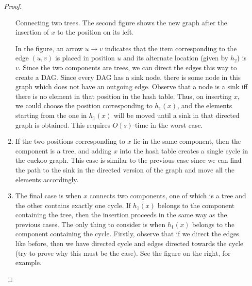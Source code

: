 \begin{proof}
\begin{enumerate}
\begin{marginfigure}
      
      \caption{Connecting two trees. The second figure shows the new graph after
        the insertion of $x$ to the position on its left.}
      \label{fig:cuckoo-insert-1}
    \end{marginfigure}

    In the figure, an arrow $u \to v$ indicates that the item corresponding to
    the edge $(u,v)$ is placed in position $u$ and its alternate location (given
    by $h_2$) is $v$. Since the two components are trees, we can direct the
    edges this way to create a DAG. Since every DAG has a sink node, there is
    some node in this graph which does not have an outgoing edge. Observe that a
    node is a sink iff there is no element in that position in the hash
    table. Thus, on inserting $x$, we could choose the position corresponding to
    $h_1(x)$, and the elements starting from the one in $h_1(x)$ will be moved
    until a sink in that directed graph is obtained. This requires $O(s)$-time
    in the worst case.
  \item If the two positions corresponding to $x$ lie in the same component,
    then the component is a tree, and adding $x$ into the hash table creates a
    single cycle in the cuckoo graph. This case is similar to the previous case
    since we can find the path to the sink in the directed version of the graph
    and move all the elements accordingly.
  \item The final case is when $x$ connects two components, one of which is a
    tree and the other contains exactly one cycle. If $h_1(x)$ belongs to the
    component containing the tree, then the insertion proceeds in the same way
    as the previous cases. The only thing to consider is when $h_1(x)$ belongs
    to the component containing the cycle. Firstly, observe that if we direct
    the edges like before, then we have directed cycle and edges directed
    towards the cycle (try to prove why this must be the case). See the figure
    on the right, for example.

    \begin{marginfigure}
      \centering
\end{marginfigure}
\end{enumerate}
\end{proof}
